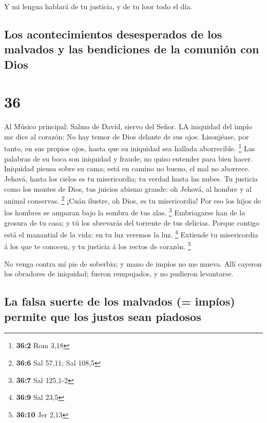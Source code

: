  Y mi lengua hablará de tu justicia, y de tu loor todo el
día.

\hypertarget{los-acontecimientos-desesperados-de-los-malvados-y-las-bendiciones-de-la-comuniuxf3n-con-dios}{%
\subsection{Los acontecimientos desesperados de los malvados y las
bendiciones de la comunión con
Dios}\label{los-acontecimientos-desesperados-de-los-malvados-y-las-bendiciones-de-la-comuniuxf3n-con-dios}}

\hypertarget{section-35}{%
\section{36}\label{section-35}}

 Al Músico principal: Salmo de David, siervo del Señor. LA
iniquidad del impío me dice al corazón: No hay temor de Dios delante de
sus ojos.  Lisonjéase, por tanto, en sus propios ojos, hasta
que su iniquidad sea hallada aborrecible. \footnote{\textbf{36:2} Rom
  3,18}  Las palabras de su boca son iniquidad y fraude; no
quiso entender para bien hacer.  Iniquidad piensa sobre su
cama; está en camino no bueno, el mal no aborrece.  Jehová,
hasta los cielos es tu misericordia; tu verdad hasta las nubes.
 Tu justicia como los montes de Dios, tus juicios abismo
grande: oh Jehová, al hombre y al animal conservas. \footnote{\textbf{36:6}
  Sal 57,11; Sal 108,5}  ¡Cuán ilustre, oh Dios, es tu
misericordia! Por eso los hijos de los hombres se amparan bajo la sombra
de tus alas. \footnote{\textbf{36:7} Sal 125,1-2} 
Embriagarse han de la grosura de tu casa; y tú los abrevarás del
torrente de tus delicias.  Porque contigo está el manantial
de la vida: en tu luz veremos la luz. \footnote{\textbf{36:9} Sal 23,5}
 Extiende tu misericordia á los que te conocen, y tu
justicia á los rectos de corazón. \footnote{\textbf{36:10} Jer 2,13}

 No venga contra mí pie de soberbia; y mano de impíos no me
mueva.  Allí cayeron los obradores de iniquidad; fueron
rempujados, y no pudieron levantarse.

\hypertarget{la-falsa-suerte-de-los-malvados-impuxedos-permite-que-los-justos-sean-piadosos}{%
\subsection{La falsa suerte de los malvados (= impíos) permite que los
justos sean
piadosos}\label{la-falsa-suerte-de-los-malvados-impuxedos-permite-que-los-justos-sean-piadosos}}

